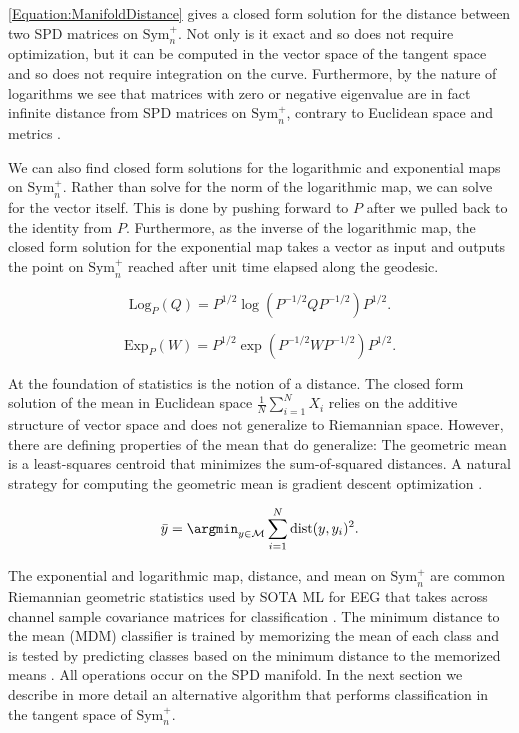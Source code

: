 \documentclass[../../../main.tex]{subfiles}
\begin{document}
\autoref{Equation:ManifoldDistance} gives a closed form solution for the distance between two SPD matrices on $\text{Sym}_n^+$. Not only is it exact and so does not require optimization, but it can be computed in the vector space of the tangent space and so does not require integration on the curve. Furthermore, by the nature of logarithms we see that matrices with zero or negative eigenvalue are in fact infinite distance from SPD matrices on $\text{Sym}_n^+$, contrary to Euclidean space and metrics \autocite{Pennec2020}.

We can also find closed form solutions for the logarithmic and exponential maps on $\text{Sym}_n^+$. Rather than solve for the norm of the logarithmic map, we can solve for the vector itself. This is done by pushing forward to $P$ after we pulled back to the identity from $P$. Furthermore, as the inverse of the logarithmic map, the closed form solution for the exponential map takes a vector as input and outputs the point on $\text{Sym}_n^+$ reached after unit time elapsed along the geodesic.

\begin{equation}
\text{Log}_P(Q) = P^{1/2}\log(P^{-1/2}QP^{-1/2})P^{1/2}.
\end{equation}

\begin{equation}
\text{Exp}_P(W) = P^{1/2}\exp(P^{-1/2}WP^{-1/2})P^{1/2}.
\end{equation}

At the foundation of statistics is the notion of a distance. The closed form solution of the mean in Euclidean space $\frac{1}{N}\sum_{i=1}^N X_i$ relies on the additive structure of vector space and does not generalize to Riemannian space. However, there are defining properties of the mean that do generalize: The geometric mean is a least-squares centroid that minimizes the sum-of-squared distances. A natural strategy for computing the geometric mean is gradient descent optimization \autocite{Fletcher2020}.

\begin{equation}
\bar{y} = \argmin_{y\in\mathcal{M}}\sum_{i=1}^N \text{dist}(y,y_i)^2.
\end{equation}

The exponential and logarithmic map, distance, and mean on $\text{Sym}_n^+$ are common Riemannian geometric statistics used by SOTA ML for EEG that takes across channel sample covariance matrices for classification \autocite{Barachant2012, Chevallier2018}. The minimum distance to the mean (MDM) classifier is trained by memorizing the mean of each class and is tested by predicting classes based on the minimum distance to the memorized means \autocite{Barachant2012}. All operations occur on the SPD manifold. In the next section we describe in more detail an alternative algorithm that performs classification in the tangent space of $\text{Sym}_n^+$.
\end{document}

